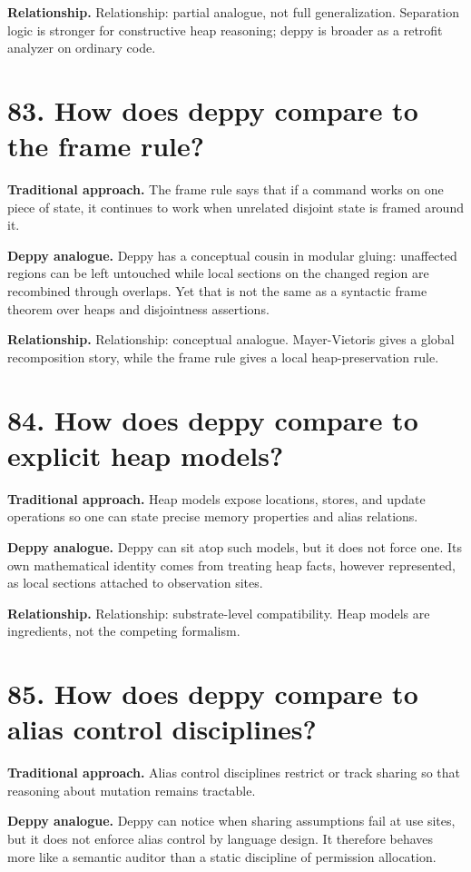 \documentclass[11pt,openany]{book}
\begin{document}
\textbf{Relationship.} Relationship: partial analogue, not full generalization. Separation logic is stronger for constructive heap reasoning; deppy is broader as a retrofit analyzer on ordinary code.

\section*{83. How does deppy compare to the frame rule?}
\textbf{Traditional approach.} The frame rule says that if a command works on one piece of state, it continues to work when unrelated disjoint state is framed around it.

\textbf{Deppy analogue.} Deppy has a conceptual cousin in modular gluing: unaffected regions can be left untouched while local sections on the changed region are recombined through overlaps. Yet that is not the same as a syntactic frame theorem over heaps and disjointness assertions.

\textbf{Relationship.} Relationship: conceptual analogue. Mayer-Vietoris gives a global recomposition story, while the frame rule gives a local heap-preservation rule.

\section*{84. How does deppy compare to explicit heap models?}
\textbf{Traditional approach.} Heap models expose locations, stores, and update operations so one can state precise memory properties and alias relations.

\textbf{Deppy analogue.} Deppy can sit atop such models, but it does not force one. Its own mathematical identity comes from treating heap facts, however represented, as local sections attached to observation sites.

\textbf{Relationship.} Relationship: substrate-level compatibility. Heap models are ingredients, not the competing formalism.

\section*{85. How does deppy compare to alias control disciplines?}
\textbf{Traditional approach.} Alias control disciplines restrict or track sharing so that reasoning about mutation remains tractable.

\textbf{Deppy analogue.} Deppy can notice when sharing assumptions fail at use sites, but it does not enforce alias control by language design. It therefore behaves more like a semantic auditor than a static discipline of permission allocation.
\end{document}
